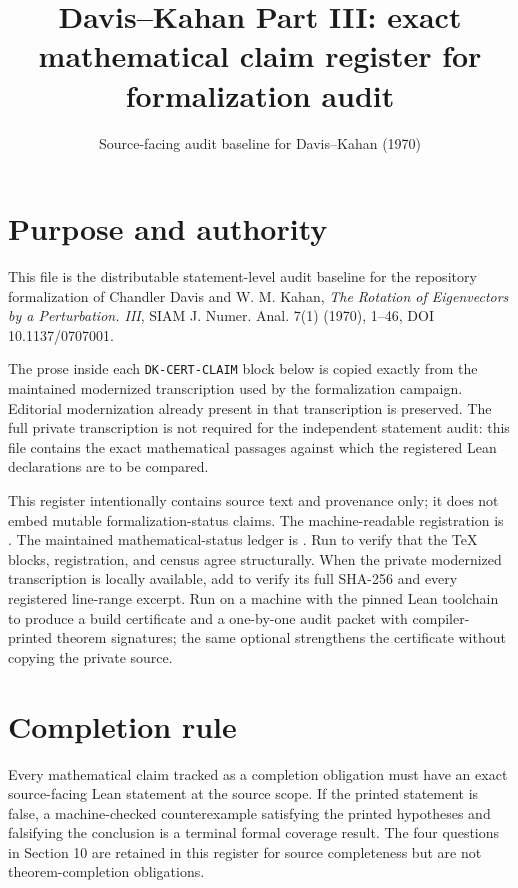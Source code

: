 
\title{Davis--Kahan Part III: exact mathematical claim register for formalization audit}
\author{}
\date{Source-facing audit baseline for Davis--Kahan (1970)}

\maketitle

\section*{Purpose and authority}
This file is the distributable statement-level audit baseline for the repository formalization of Chandler Davis and W. M. Kahan, \emph{The Rotation of Eigenvectors by a Perturbation. III}, SIAM J. Numer. Anal. 7(1) (1970), 1--46, DOI 10.1137/0707001.

The prose inside each \texttt{DK-CERT-CLAIM} block below is copied exactly from the maintained modernized transcription used by the formalization campaign.  Editorial modernization already present in that transcription is preserved.  The full private transcription is not required for the independent statement audit: this file contains the exact mathematical passages against which the registered Lean declarations are to be compared.

This register intentionally contains source text and provenance only; it does not embed mutable formalization-status claims.  The machine-readable registration is .  The maintained mathematical-status ledger is .  Run  to verify that the TeX blocks, registration, and census agree structurally.  When the private modernized transcription is locally available, add  to verify its full SHA-256 and every registered line-range excerpt.  Run  on a machine with the pinned Lean toolchain to produce a build certificate and a one-by-one audit packet with compiler-printed theorem signatures; the same optional  strengthens the certificate without copying the private source.

\section*{Completion rule}
Every mathematical claim tracked as a completion obligation must have an exact source-facing Lean statement at the source scope.  If the printed statement is false, a machine-checked counterexample satisfying the printed hypotheses and falsifying the conclusion is a terminal formal coverage result.  The four questions in Section 10 are retained in this register for source completeness but are not theorem-completion obligations.

